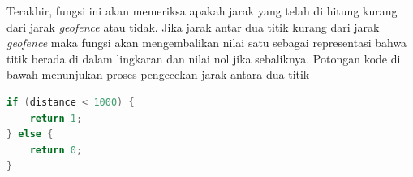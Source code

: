 Terakhir, fungsi ini akan memeriksa apakah jarak yang telah di hitung kurang dari jarak \textit{geofence} atau tidak. Jika jarak antar dua titik kurang dari jarak \textit{geofence} maka fungsi akan mengembalikan nilai satu sebagai representasi bahwa titik berada di dalam lingkaran dan nilai nol jika sebaliknya. Potongan kode di bawah menunjukan proses pengecekan jarak antara dua titik
\begin{lstlisting}[language=c]
 if (distance < 1000) {
	return 1;
} else {
	return 0;
}
\end{lstlisting}
